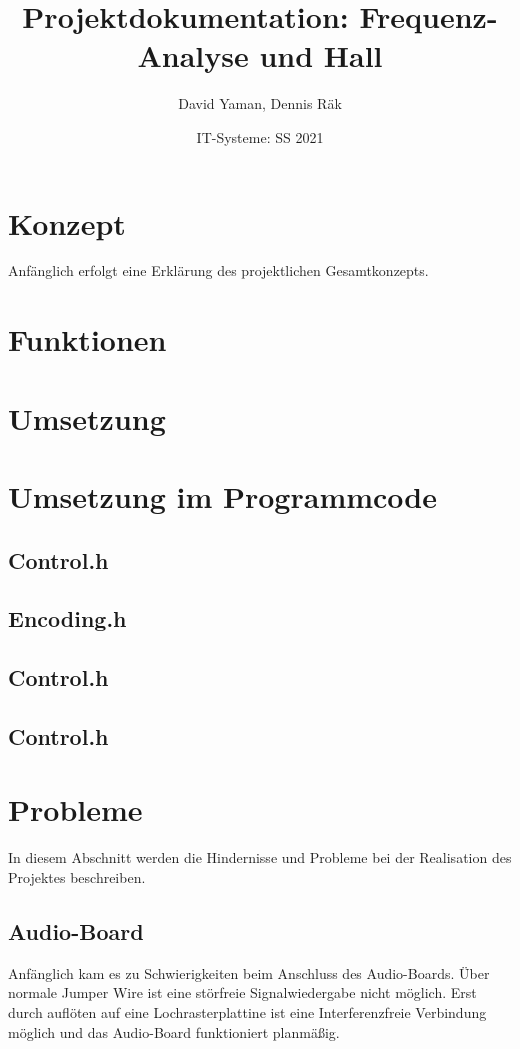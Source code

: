 \documentclass[12pt]{article}
\title{Projektdokumentation: Frequenz-Analyse und Hall}        %
\author{David Yaman, Dennis Räk}            %
\date{IT-Systeme: SS 2021}                    %
\begin{document}
\maketitle
\newpage
\section{Konzept}
Anfänglich erfolgt eine Erklärung des projektlichen Gesamtkonzepts.
\section{Funktionen}
\section{Umsetzung}
\section{Umsetzung im Programmcode}

\subsection{Control.h}
\subsection{Encoding.h}
\subsection{Control.h}
\subsection{Control.h}

\section{Probleme}
In diesem Abschnitt werden die Hindernisse und Probleme bei der Realisation des Projektes beschreiben.
\subsection{Audio-Board}
Anfänglich kam es zu Schwierigkeiten beim Anschluss des Audio-Boards. Über normale Jumper Wire ist eine störfreie Signalwiedergabe nicht möglich. 
Erst durch auflöten auf eine Lochrasterplattine ist eine Interferenzfreie Verbindung möglich und das Audio-Board funktioniert planmäßig.
\end{document}
